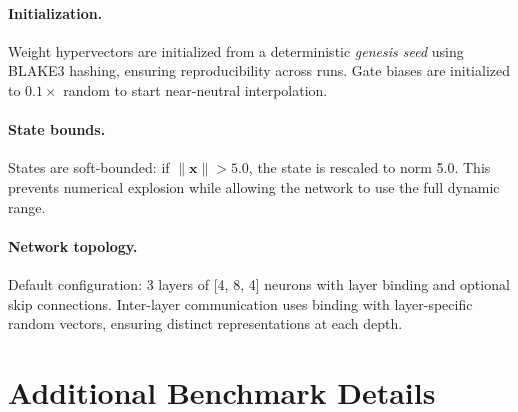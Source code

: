 \documentclass{article}
\newcommand{\hvx}{\mathbf{x}}
\begin{document}
\paragraph{Initialization.} Weight hypervectors are initialized from a deterministic \emph{genesis seed} using BLAKE3 hashing, ensuring reproducibility across runs. Gate biases are initialized to $0.1 \times$ random to start near-neutral interpolation.

\paragraph{State bounds.} States are soft-bounded: if $\|\hvx\| > 5.0$, the state is rescaled to norm 5.0. This prevents numerical explosion while allowing the network to use the full dynamic range.

\paragraph{Network topology.} Default configuration: 3 layers of [4, 8, 4] neurons with layer binding and optional skip connections. Inter-layer communication uses binding with layer-specific random vectors, ensuring distinct representations at each depth.

\section{Additional Benchmark Details}
\label{app:benchmarks}
\end{document}
